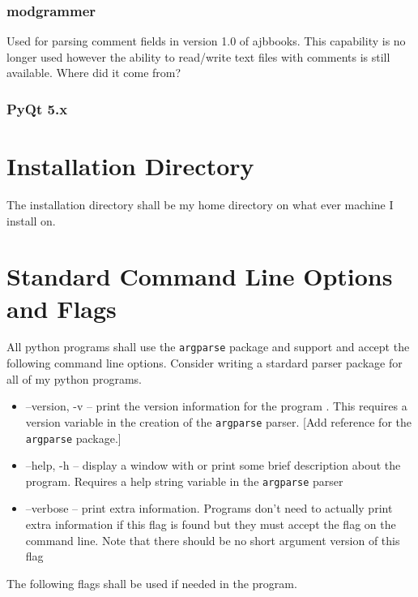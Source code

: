 \subsubsection{modgrammer}

Used for parsing comment fields in version 1.0 of ajbbooks. This
capability is no longer used however the ability to read/write
text files with comments is still available. Where did it come from?

\subsubsection{PyQt 5.x}

\section{Installation Directory}

The installation directory shall be my home directory on what ever machine
I install on.

\section{Standard Command Line Options and Flags}

All python programs shall use the \texttt{argparse} package and
support and accept the following command line options. Consider
writing a stardard parser package for all of my python programs.

\begin{itemize}

  \item --version, -v -- print the version information for the program .
   This requires a version variable in the creation of the
   \texttt{argparse} parser.  [Add reference for the \texttt{argparse}
   package.]

  \item --help, -h -- display a window with or print some brief
    description about the program. Requires a help string variable in the 
    \texttt{argparse} parser 

  \item --verbose -- print extra information. Programs don't
    need to actually print extra information if this flag is found but
    they must accept the flag on the command line. Note that 
    there should be no short argument version of this flag
\end{itemize}

The following flags shall be used if needed in the program.


